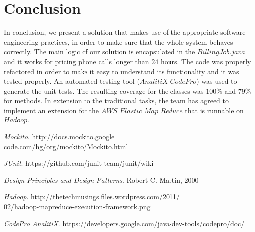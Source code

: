 \documentclass[11pt,twocolumn]{article} %
\begin{document}
\section{Conclusion}
In conclusion, we present a solution that makes use of the appropriate software engineering practices, in order to 
make sure that the whole system behaves correctly.
The main logic of our solution is encapsulated in the $BillingJob.java$ and it works for pricing phone calls longer than $24$ hours. 
The code was properly refactored in order to make it easy to understand its functionality and it was tested properly.
An automated testing tool ($AnalitiX$ $CodePro$) was used to generate the unit tests.
The resulting coverage for the classes was $100\%$ and $79\%$ for methods.
In extension to the traditional tasks, the team has agreed to implement an extension for the $AWS$ $Elastic$ $Map$ $Reduce$ that is runnable on $Hadoop$.

\begin{thebibliography}{9}
  \emph{Mockito}.
  http://docs.mockito.google\\code.com/hg/org/mockito/Mockito.html  

  \emph{JUnit}.
  https://github.com/junit-team/junit/wiki

  \emph{Design Principles and Design Patterns}.
  Robert C. Martin,
  2000

  \emph{Hadoop}.
  http://thetechmusings.files.wordpress.com/2011/\\02/hadoop-mapreduce-execution-framework.png
  
  \emph{CodePro AnalitiX}.
  https://developers.google.com/java-dev-tools/codepro/doc/ 
  
\end{thebibliography}
\end{document}
